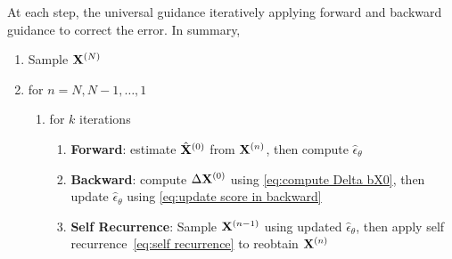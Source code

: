 \documentclass[11pt]{article}
\begin{document}
At each step, the universal guidance iteratively applying forward and backward guidance to correct the error.
In summary,
\begin{enumerate}
    \item Sample ${\bf X}^{(N)}$
    \item for $n=N, N-1, \dots, 1$
    \begin{enumerate}
        \item for $k$ iterations
        \begin{enumerate}
            \item {\bf Forward}: estimate $\hat{{\bf X}}^{(0)}$ from ${\bf X}^{(n)}$, then compute $\hat{\epsilon}_{\theta}$ 
            \item {\bf Backward}: compute $\Delta {\bf X}^{(0)}$ using \eqref{eq:compute Delta bX0},
                then  update $\hat{\epsilon}_{\theta}$ using \eqref{eq:update score in backward}
            \item {\bf Self Recurrence}: Sample ${\bf X}^{(n-1)}$ using updated $\hat{\epsilon}_{\theta}$,
                then apply self recurrence~\eqref{eq:self recurrence} to reobtain ${\bf X}^{(n)}$
        \end{enumerate}
        
    \end{enumerate}
\end{enumerate}














{\small


% 
}
\end{document}
